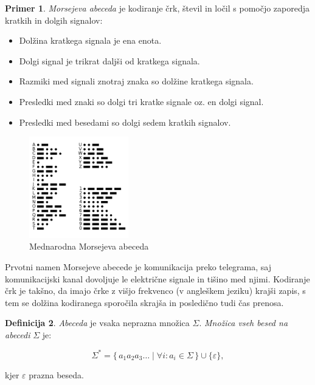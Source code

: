 \documentclass{amsart}
\theoremstyle{definition} %
\newtheorem{definicija}{Definicija}[section]
\newtheorem{primer}[definicija]{Primer}
\theoremstyle{plain} %
\begin{document}
\begin{primer}

    \textit{Morsejeva abeceda} je kodiranje črk, števil in ločil s pomočjo zaporedja kratkih
    in dolgih signalov:

    \begin{itemize}
        \item Dolžina kratkega signala je ena enota.
        \item Dolgi signal je trikrat daljši od kratkega signala.
        \item Razmiki med signali znotraj znaka so dolžine kratkega signala.
        \item Presledki med znaki so dolgi tri kratke signale oz. en dolgi signal.
        \item Presledki med besedami so dolgi sedem kratkih signalov.
    \end{itemize}

    \begin{figure}[h]
        \centering
        \includegraphics[width=4.3cm]{International_Morse_Code.svg.png}
        \caption{Mednarodna Morsejeva abeceda}
    \end{figure}

    Prvotni namen Morsejeve abecede je komunikacija preko telegrama, saj komunikacijski
    kanal dovoljuje le električne signale in tišino med njimi.  Kodiranje črk je takšno,
    da imajo črke z višjo frekvenco (v angleškem jeziku) krajši zapis, s tem se dolžina
     kodiranega sporočila skrajša in posledično tudi čas prenosa.

\end{primer}

\begin{definicija}

    \textit{Abeceda} je vsaka neprazna množica $ \Sigma $. \textit{Množica vseh besed na    %
    abecedi} $ \Sigma $ je:

    \begin{equation*}
        \Sigma^* = \{ \, a_1 a_2 a_3 \dots \mid \forall i: a_i \in \Sigma \, \} \cup \{ \varepsilon \}, 
    \end{equation*}

    kjer $ \varepsilon $ prazna beseda.

\end{definicija}
\end{document}
